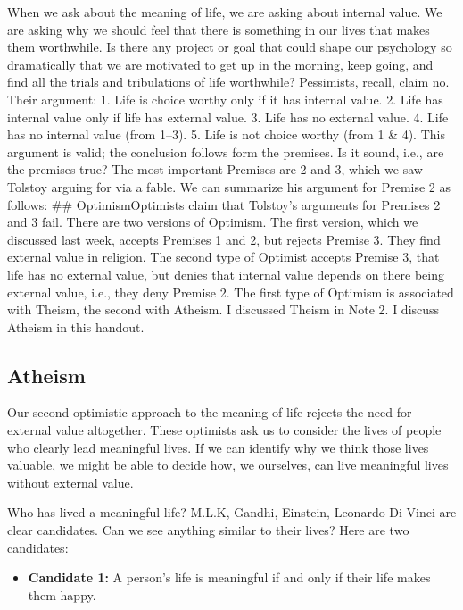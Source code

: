 \documentclass[]{article}
\begin{document}
When we ask about the meaning of life, we are asking about internal
value. We are asking why we should feel that there is something in our
lives that makes them worthwhile. Is there any project or goal that
could shape our psychology so dramatically that we are motivated to get
up in the morning, keep going, and find all the trials and tribulations
of life worthwhile? Pessimists, recall, claim no. Their argument: 1.
Life is choice worthy only if it has internal value. 2. Life has
internal value only if life has external value. 3. Life has no external
value. 4. Life has no internal value (from 1--3). 5. Life is not choice
worthy (from 1 \& 4). This argument is valid; the conclusion follows
form the premises. Is it sound, i.e., are the premises true? The most
important Premises are 2 and 3, which we saw Tolstoy arguing for via a
fable. We can summarize his argument for Premise 2 as follows: \#\#
OptimismOptimists claim that Tolstoy's arguments for Premises 2 and 3
fail. There are two versions of Optimism. The first version, which we
discussed last week, accepts Premises 1 and 2, but rejects Premise 3.
They find external value in religion. The second type of Optimist
accepts Premise 3, that life has no external value, but denies that
internal value depends on there being external value, i.e., they deny
Premise 2. The first type of Optimism is associated with Theism, the
second with Atheism. I discussed Theism in Note 2. I discuss Atheism in
this handout.

\subsection{Atheism}\label{atheism}

Our second optimistic approach to the meaning of life rejects the need
for external value altogether. These optimists ask us to consider the
lives of people who clearly lead meaningful lives. If we can identify
why we think those lives valuable, we might be able to decide how, we
ourselves, can live meaningful lives without external value.

Who has lived a meaningful life? M.L.K, Gandhi, Einstein, Leonardo Di
Vinci are clear candidates. Can we see anything similar to their lives?
Here are two candidates:

\begin{itemize}
\itemsep1pt\parskip0pt
\item
  \textbf{Candidate 1:} A person's life is meaningful if and only if
  their life makes them happy.
\end{itemize}
\end{document}
